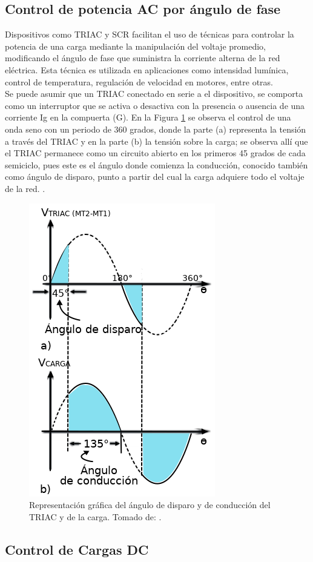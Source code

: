 \subsection{Control de potencia AC por ángulo de fase}

Dispositivos como TRIAC y SCR facilitan el uso de técnicas para controlar la potencia de una carga mediante la manipulación del voltaje promedio, modificando el ángulo de fase que suministra la corriente alterna de la red eléctrica. Esta técnica es utilizada en aplicaciones como intensidad lumínica, control de temperatura, regulación de velocidad en motores, entre otras.\cite{CEKIT}\\

Se puede asumir que un TRIAC	conectado en serie a el dispositivo, se comporta como un interruptor que se activa o desactiva con la presencia o ausencia de una corriente Ig en la compuerta (G). En la Figura \ref{fig:triacgraph} se observa el control de una onda seno con un periodo de 360 grados, donde la parte (a) representa la tensión a través del TRIAC y en la parte (b) la tensión sobre la carga; se observa allí que el TRIAC permanece como un circuito abierto en los primeros 45 grados de cada semiciclo, pues este es el ángulo donde comienza la conducción, conocido también como ángulo de disparo, punto a partir del cual la carga adquiere todo el voltaje de la red. \cite{CEKIT}.\\


\begin{figure}[H]
	\centering
	\caption[Representación gráfica del ángulo de disparo y de conducción del TRIAC y de la carga.]{Representación gráfica del ángulo de disparo y de conducción del TRIAC y de la carga. Tomado de: \cite{CEKIT}.}
	\label{fig:triacgraph}
	\includegraphics[width=0.3\linewidth]{Imagenes/TRIAC_graph}
\end{figure}

\subsection{Control de Cargas DC}

